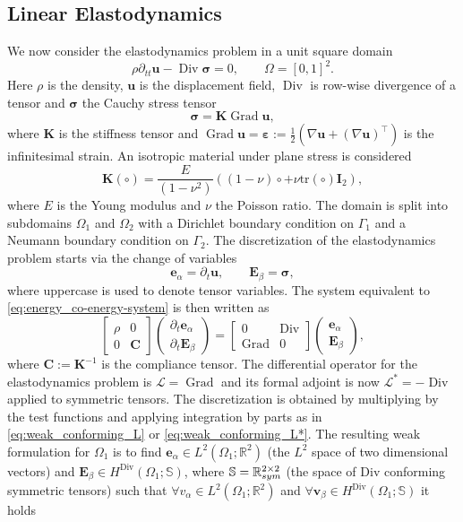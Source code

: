\documentclass[11pt,a4paper]{article}
\newcommand{\bbR}{\mathbb{R}}
\newcommand{\bbS}{\mathbb{S}}
\DeclareMathOperator*{\Grad}{Grad}
\DeclareMathOperator*{\Div}{Div}
\begin{document}
\subsection{Linear Elastodynamics}\label{sec:elasticity}
We now consider the elastodynamics problem in a unit square domain
\begin{equation}\label{eq:elasticity_primal}
\rho\partial_{tt}\bm{u}-\Div\bm{\sigma}=0, \qquad \Omega = [0, 1]^ 2.
\end{equation}
Here $\rho$ is the density, $\bm{u}$ is the displacement field, $\Div$ is row-wise divergence of a tensor and $\bm{\sigma}$ the Cauchy stress tensor
$$
\bm{\sigma} = \bm{K} \Grad \bm{u},
$$
where $\bm{K}$ is the stiffness tensor and $\Grad \bm{u} = \bm{\varepsilon}:=\frac{1}{2}(\nabla\bm{u} + (\nabla\bm{u})^\top)$ is the infinitesimal strain. An isotropic material under plane stress is considered
$$
\bm{K}(\circ) = \frac{E}{(1 - \nu^2)} ((1 - \nu)\circ + \nu\mathrm{tr}(\circ)\bm{I}_2),
$$
where $E$ is the Young modulus and $\nu$ the Poisson ratio. The domain is split into subdomains $\Omega_1$ and $\Omega_2$ with a Dirichlet boundary condition on $\Gamma_1$ and a Neumann boundary condition on $\Gamma_2$. The discretization of the elastodynamics problem starts via the change of variables
\begin{equation}
     \bm{e}_{\alpha} = \partial_t\bm{u}, \qquad \bm{E}_{\beta} = \bm{\sigma},
\end{equation}
where uppercase is used to denote tensor variables. The system equivalent to \eqref{eq:energy_co-energy-system} is then written as
\begin{equation}
    \begin{bmatrix}
        \rho & 0 \\
        0 & \bm{C}
    \end{bmatrix}
    \begin{pmatrix}
        \partial_t\bm{e}_{\alpha} \\
        \partial_t\bm{E}_{\beta}
    \end{pmatrix} = 
    \begin{bmatrix}
        0 & \Div \\
        \Grad & 0
    \end{bmatrix}
    \begin{pmatrix}
        \bm{e}_{\alpha} \\
        \bm{E}_{\beta}
    \end{pmatrix},
\end{equation}
where $\bm{C} := \bm{K}^{-1}$ is the compliance tensor. The differential operator for the elastodynamics problem is $\mathcal{L}=\Grad$ and its formal adjoint is now $\mathcal{L}^*=-\Div$ applied to symmetric tensors. The discretization is obtained by multiplying by the test functions and applying integration by parts as in \eqref{eq:weak_conforming_L} or \eqref{eq:weak_conforming_L*}. The resulting weak formulation for $\Omega_1$ is to find $\bm{e}_\alpha\in L^2(\Omega_1; \bbR^2)$ (the $L^2$ space of two dimensional vectors) and $\bm{E}_\beta\in H^{\Div}(\Omega_1; \bbS)$, where $\bbS = \mathbb{R}^{2\times 2}_{\rm sym}$ (the space of Div conforming symmetric tensors) such that $\forall{v}_\alpha\in L^2(\Omega_1; \bbR^2)$ and $\forall\bm{v}_\beta\in H^{\Div}(\Omega_1; \bbS)$ it holds
\end{document}
